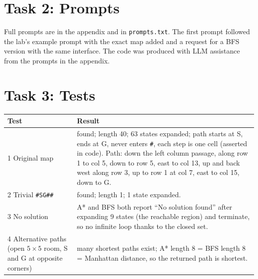 \documentclass[10pt,a4paper]{article}
\begin{document}
\section*{Task 2: Prompts}
Full prompts are in the appendix and in \texttt{prompts.txt}. The first prompt followed the lab's example prompt with the exact map added and a request for a BFS version with the same interface. The code was produced with LLM assistance from the prompts in the appendix.

\section*{Task 3: Tests}
\begin{tabular}{p{3.6cm}p{12.5cm}}\toprule
Test & Result\\\midrule
1 Original map & found; length 40; 63 states expanded; path starts at S, ends at G, never enters \texttt{\#}, each step is one cell (asserted in code). Path: down the left column passage, along row 1 to col 5, down to row 5, east to col 13, up and back west along row 3, up to row 1 at col 7, east to col 15, down to G.\\
2 Trivial \texttt{\#SG\#\#} & found; length 1; 1 state expanded.\\
3 No solution & A* and BFS both report ``No solution found'' after expanding 9 states (the reachable region) and terminate, so no infinite loop thanks to the closed set.\\
4 Alternative paths (open $5\times5$ room, S and G at opposite corners) & many shortest paths exist; A* length 8 = BFS length 8 = Manhattan distance, so the returned path is shortest.\\\bottomrule\end{tabular}
\end{document}
